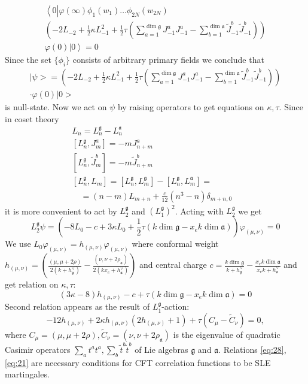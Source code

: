 \documentclass{jetpl}
\newcommand{\gf}{\mathfrak{g}}
\newcommand{\af}{\mathfrak{a}}
\begin{document}
\begin{multline}
  \label{eq:7}
  \left<0\left|\varphi(\infty)\phi_{1}(w_{1})\dots\phi_{2N}(w_{2N})\right.\right.\\
  \left(-2L_{-2}+\frac{1}{2}\kappa L_{-1}^{2}+\frac{1}{2}\tau \left(\sum_{a=1}^{\dim\gf}J^{a}_{-1}J^{a}_{-1}-\sum_{b=1}^{\dim\af}\tilde{J}^{b}_{-1}\tilde{J}^{b}_{-1}\right)\right)\\
\left.\varphi(0)|0\right>=0
\end{multline}
Since the set $\{\phi_{i}\}$ consists of arbitrary primary fields we conclude that 
\begin{multline}
|\psi>=\left(-2L_{-2}+\frac{1}{2}\kappa L_{-1}^{2}+\frac{1}{2}\tau \left(\sum_{a=1}^{\dim\gf}J^{a}_{-1}J^{a}_{-1}-\sum_{b=1}^{\dim\af}\tilde{J}^{b}_{-1}\tilde{J}^{b}_{-1}\right)\right)\\
\cdot\varphi(0)|0>
\end{multline}
is null-state. Now we act on $\psi$ by raising operators to get equations on $\kappa,\tau$. Since in coset theory
\begin{equation}
  \label{eq:18}
\begin{array}{ll}
  L_{n}= L_{n}^{\gf}-L_{n}^{\af} &\\
  \left[L_{n}^{\gf},J^{a}_{m}\right]= -m J^{a}_{n+m}&\\
  \left[L_{n}^{\gf},\tilde{J}^{b}_{m}\right]=-m\tilde{J}^{b}_{n+m}&\\
  \left[L_{n}^{\gf},L_{m}\right]=[L_{n}^{\gf},L_{m}^{\gf}]-[L_{n}^{\gf},L_{m}^{\af}]=&\\
  \quad =(n-m)L_{m+n}+\frac{c}{12}(n^{3}-n)\delta_{m+n,0}&
\end{array}
\end{equation}
 it is more convenient to act by $L_{2}^{\gf}$ and $\left(L_{1}^{\gf}\right)^{2}$. 
 Acting with $L_{2}^{\gf}$ we get
\begin{equation*}
  L_{2}^{\gf}\psi= \left(-8 L_{0}-c+ 3 \kappa L_{0}+\frac{1}{2}\tau (k \dim\gf-x_{e}k\dim\af)\right) \varphi_{(\mu,\nu)}=0
\end{equation*}
We use $L_{0} \varphi_{(\mu,\nu)}=h_{(\mu,\nu)} \varphi_{(\mu,\nu)}$ where conformal weight $h_{(\mu,\nu)}= \left(\frac{(\mu,\mu+2\rho)}{2(k+h^{\vee}_{\gf})}-\frac{(\nu,\nu+2\rho_{\af})}{2(k x_{e}+h^{\vee}_{\af})}\right)$ and central charge $c=\frac{k\dim \gf}{k+h^{\vee}_{\gf}}-\frac{x_{e}k\dim \af}{x_{e} k+h^{\vee}_{\af}}$ and get relation on $\kappa,\tau$:
\begin{equation}
  \label{eq:28} (3\kappa-8)h_{(\mu,\nu)}-c+\tau (k\dim\gf-x_{e}k\dim\af) =0
\end{equation}
Second relation appears as the result of $L_{1}^{\gf}$-action:
\begin{equation}
  \label{eq:21}
 -12 h_{(\mu,\nu)}+2\kappa h_{(\mu,\nu)} (2h_{(\mu,\nu)}+1) + \tau
(C_{\mu}-\tilde{C}_{\nu})=0,
\end{equation}
 where $C_{\mu}=(\mu,\mu+2\rho), \tilde{C}_{\nu}=(\nu,\nu+2\rho_{\af})$ is the eigenvalue of quadratic Casimir operators $\sum_{a}t^{a}t^{a}, \sum_{b}\tilde{t}^{b}\tilde{t}^{b}$ of Lie algebras $\gf$ and $\af$.
Relations \eqref{eq:28},\eqref{eq:21} are necessary conditions for CFT correlation functions to be SLE martingales. 
\end{document}
